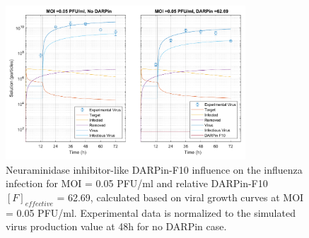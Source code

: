 \begin{figure}
\begin{center}
\includegraphics[width=0.8\textwidth, trim={0cm 0cm 0cm 0cm}, clip]{D_chapters/3_DARPinModels/2_DARPinProduction/comparisonModelTHillIRVViDelayMOI0.072135DARPin62.6898AsymmetricDarpinMyosinInhibitor.pdf}
\caption[Neuraminidase inhibitor-like DARPin-F10 for MOI = 0.05 PFU/ml and $F_{effective}$ = 62.69]{Neuraminidase inhibitor-like DARPin-F10 influence on the influenza infection for MOI = 0.05 PFU/ml and relative DARPin-F10 $[F]_{effective}$ = 62.69, calculated based on viral growth curves at MOI = 0.05 PFU/ml. Experimental data is normalized to the simulated virus production value at 48h for no DARPin case.}
\label{figure:neuraminidaseInhibitorLikeF62}
\end{center}
\end{figure}